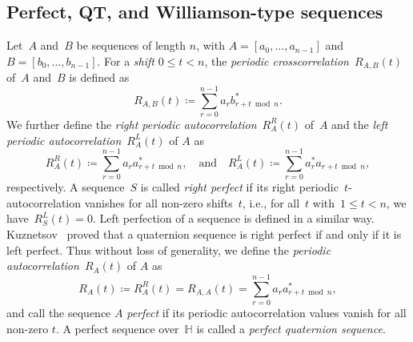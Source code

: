 \documentclass[12pt]{article}
\numberwithin{equation}{section}
\newcommand{\HH}{\mathbb{H}}
\newcommand{\eqdef}{\coloneqq}
\begin{document}
\subsection{Perfect, QT, and Williamson-type sequences}\label{sec:sequences}

Let~$A$ and~$B$ be sequences of length $n$, with $A = [a_0, \dotsc, a_{n-1}]$ and~$B = [b_0, \dotsc, b_{n-1}]$.
For a \emph{shift\/} $0 \le t < n$, the \emph{periodic crosscorrelation\/}~$R_{A,B}(t)$ of~$A$ and~$B$ is defined as
\[
R_{A,B}(t)\eqdef \sum_{r=0}^{n-1} a_r b^*_{r+t\bmod n} .
\]
We further define the \emph{right periodic autocorrelation\/}~$R_A^R(t)$ of~$A$ and the \emph{left periodic autocorrelation\/}~$R_A^L(t)$ of $A$ as
\begin{equation*}
    R_A^R(t)\eqdef\sum_{r=0}^{n-1}a_r a_{r+t\bmod n}^*,\quad\text{and}\quad
    R_A^L(t)\eqdef\sum_{r=0}^{n-1}a_r^*a_{r+t\bmod n},
\end{equation*}
respectively. 
A sequence~$S$ is called \emph{right perfect\/} if its right periodic~$t$-autocorrelation vanishes for all non-zero shifts~$t$, i.e., for all~$t$ with~$1 \leq t < n$, we have~$R^L_S(t) = 0$. Left perfection of a sequence is defined in a similar way. Kuznetsov~\cite{Kuznetsov2009} proved that a quaternion sequence is right perfect if and only if it is left perfect. Thus without loss of generality, we define the \emph{periodic autocorrelation\/}~$R_A(t)$ of $A$ as
\[
R_A(t)\eqdef R^R_A(t) = R_{A,A}(t)=\sum_{r=0}^{n-1}a_r a_{r+t\bmod n}^*,
\]
and call the sequence $A$ \emph{perfect\/} if its periodic autocorrelation values vanish for all non-zero $t$.
A perfect sequence over~$\HH$ is called a \emph{perfect quaternion sequence\/}. 
\end{document}
